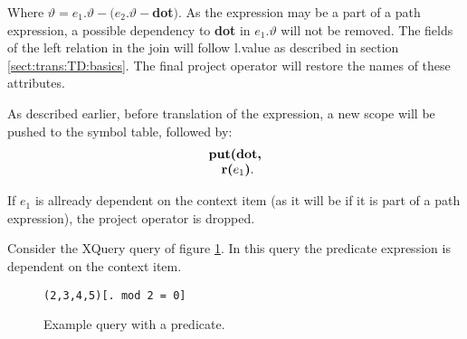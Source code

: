 Where $\vartheta=e_1.\vartheta-(e_2.\vartheta-$\textbf{dot}$)$. As the expression may be a part of a path
expression, a possible dependency to \textbf{dot} in $e_1.\vartheta$ will not be removed. The fields of the left
relation in the join will follow \textsf{l.value} as described in section \ref{sect:trans:TD:basics}. The final
\textsf{project} operator will restore the names of these attributes.

As described earlier, before translation of the expression, a new scope will be pushed to the symbol table,
followed by:
\begin{equation*} 
\begin{array}{l}
\mbox{\textbf{put(dot,}} \\ \quad
\mbox{\textbf{r(}}e_1 \mbox{\textbf{)}}.
\end{array}
\end{equation*}

If $e_1$ is allready dependent on the context item (as it will be if it is part of a path expression), the
\textsf{project} operator is dropped.

\begin{myExample}
Consider the XQuery query of figure \ref{fig:trans:TD:predQu}. In this query the predicate expression is dependent
on the context item.
\begin{figure}[h]
\centering
\texttt{(2,3,4,5)[. mod 2 = 0]}
\caption{Example query with a predicate. \label{fig:trans:TD:predQu}}
\end{figure}


\end{myExample}